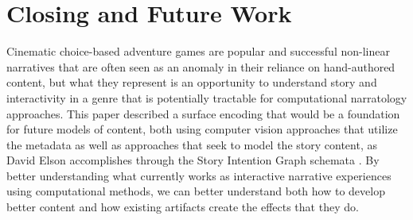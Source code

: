 \documentclass{llncs}
\begin{document}
\section*{Closing and Future Work}
\label{sec:orgheadline17}
Cinematic choice-based adventure games are popular and successful
non-linear narratives that are often seen as an anomaly in their
reliance on hand-authored content, but what they represent is an
opportunity to understand story and interactivity in a genre that is
potentially tractable for computational narratology approaches. This
paper described a surface encoding that would be a foundation for
future models of content, both using computer vision approaches that
utilize the metadata as well as approaches that seek to model the
story content, as David Elson accomplishes through the Story Intention
Graph schemata \cite{Elson2012}. By better understanding what
currently works as interactive narrative experiences using
computational methods, we can better understand both how to develop
better content and how existing artifacts create the effects that they
do.



\end{document}
